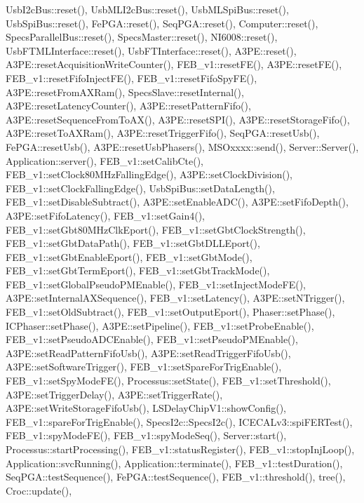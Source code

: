 Usb\+I2c\+Bus\+::reset(), Usb\+M\+L\+I2c\+Bus\+::reset(), Usb\+M\+L\+Spi\+Bus\+::reset(), Usb\+Spi\+Bus\+::reset(), Fe\+P\+G\+A\+::reset(), Seq\+P\+G\+A\+::reset(), Computer\+::reset(), Specs\+Parallel\+Bus\+::reset(), Specs\+Master\+::reset(), N\+I6008\+::reset(), Usb\+F\+T\+M\+L\+Interface\+::reset(), Usb\+F\+T\+Interface\+::reset(), A3\+P\+E\+::reset(), A3\+P\+E\+::reset\+Acquisition\+Write\+Counter(), F\+E\+B\+\_\+v1\+::reset\+F\+E(), A3\+P\+E\+::reset\+F\+E(), F\+E\+B\+\_\+v1\+::reset\+Fifo\+Inject\+F\+E(), F\+E\+B\+\_\+v1\+::reset\+Fifo\+Spy\+F\+E(), A3\+P\+E\+::reset\+From\+A\+X\+Ram(), Specs\+Slave\+::reset\+Internal(), A3\+P\+E\+::reset\+Latency\+Counter(), A3\+P\+E\+::reset\+Pattern\+Fifo(), A3\+P\+E\+::reset\+Sequence\+From\+To\+A\+X(), A3\+P\+E\+::reset\+S\+P\+I(), A3\+P\+E\+::reset\+Storage\+Fifo(), A3\+P\+E\+::reset\+To\+A\+X\+Ram(), A3\+P\+E\+::reset\+Trigger\+Fifo(), Seq\+P\+G\+A\+::reset\+Usb(), Fe\+P\+G\+A\+::reset\+Usb(), A3\+P\+E\+::reset\+Usb\+Phasers(), M\+S\+Oxxxx\+::send(), Server\+::\+Server(), Application\+::server(), F\+E\+B\+\_\+v1\+::set\+Calib\+Cte(), F\+E\+B\+\_\+v1\+::set\+Clock80\+M\+Hz\+Falling\+Edge(), A3\+P\+E\+::set\+Clock\+Division(), F\+E\+B\+\_\+v1\+::set\+Clock\+Falling\+Edge(), Usb\+Spi\+Bus\+::set\+Data\+Length(), F\+E\+B\+\_\+v1\+::set\+Disable\+Subtract(), A3\+P\+E\+::set\+Enable\+A\+D\+C(), A3\+P\+E\+::set\+Fifo\+Depth(), A3\+P\+E\+::set\+Fifo\+Latency(), F\+E\+B\+\_\+v1\+::set\+Gain4(), F\+E\+B\+\_\+v1\+::set\+Gbt80\+M\+Hz\+Clk\+Eport(), F\+E\+B\+\_\+v1\+::set\+Gbt\+Clock\+Strength(), F\+E\+B\+\_\+v1\+::set\+Gbt\+Data\+Path(), F\+E\+B\+\_\+v1\+::set\+Gbt\+D\+L\+L\+Eport(), F\+E\+B\+\_\+v1\+::set\+Gbt\+Enable\+Eport(), F\+E\+B\+\_\+v1\+::set\+Gbt\+Mode(), F\+E\+B\+\_\+v1\+::set\+Gbt\+Term\+Eport(), F\+E\+B\+\_\+v1\+::set\+Gbt\+Track\+Mode(), F\+E\+B\+\_\+v1\+::set\+Global\+Pseudo\+P\+M\+Enable(), F\+E\+B\+\_\+v1\+::set\+Inject\+Mode\+F\+E(), A3\+P\+E\+::set\+Internal\+A\+X\+Sequence(), F\+E\+B\+\_\+v1\+::set\+Latency(), A3\+P\+E\+::set\+N\+Trigger(), F\+E\+B\+\_\+v1\+::set\+Old\+Subtract(), F\+E\+B\+\_\+v1\+::set\+Output\+Eport(), Phaser\+::set\+Phase(), I\+C\+Phaser\+::set\+Phase(), A3\+P\+E\+::set\+Pipeline(), F\+E\+B\+\_\+v1\+::set\+Probe\+Enable(), F\+E\+B\+\_\+v1\+::set\+Pseudo\+A\+D\+C\+Enable(), F\+E\+B\+\_\+v1\+::set\+Pseudo\+P\+M\+Enable(), A3\+P\+E\+::set\+Read\+Pattern\+Fifo\+Usb(), A3\+P\+E\+::set\+Read\+Trigger\+Fifo\+Usb(), A3\+P\+E\+::set\+Software\+Trigger(), F\+E\+B\+\_\+v1\+::set\+Spare\+For\+Trig\+Enable(), F\+E\+B\+\_\+v1\+::set\+Spy\+Mode\+F\+E(), Processus\+::set\+State(), F\+E\+B\+\_\+v1\+::set\+Threshold(), A3\+P\+E\+::set\+Trigger\+Delay(), A3\+P\+E\+::set\+Trigger\+Rate(), A3\+P\+E\+::set\+Write\+Storage\+Fifo\+Usb(), L\+S\+Delay\+Chip\+V1\+::show\+Config(), F\+E\+B\+\_\+v1\+::spare\+For\+Trig\+Enable(), Specs\+I2c\+::\+Specs\+I2c(), I\+C\+E\+C\+A\+Lv3\+::spi\+F\+E\+R\+Test(), F\+E\+B\+\_\+v1\+::spy\+Mode\+F\+E(), F\+E\+B\+\_\+v1\+::spy\+Mode\+Seq(), Server\+::start(), Processus\+::start\+Processing(), F\+E\+B\+\_\+v1\+::status\+Register(), F\+E\+B\+\_\+v1\+::stop\+Inj\+Loop(), Application\+::svc\+Running(), Application\+::terminate(), F\+E\+B\+\_\+v1\+::test\+Duration(), Seq\+P\+G\+A\+::test\+Sequence(), Fe\+P\+G\+A\+::test\+Sequence(), F\+E\+B\+\_\+v1\+::threshold(), tree(), Croc\+::update(), 